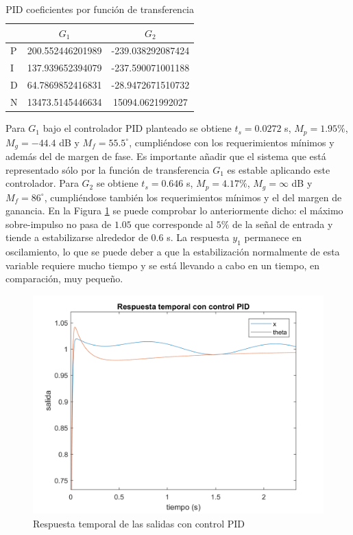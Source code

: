 \documentclass[journal]{IEEEtran}
\begin{document}
\begin{table}[!h]
\centering
\caption{PID coeficientes por función de transferencia}
\label{tab:PID}
\begin{tabular}{@{}lcc@{}}
\toprule
                  & $G_1$ & $G_2$          \\ \midrule
P & 200.552446201989 & -239.038292087424 \\
I & 137.939652394079 & -237.590071001188           \\
D & 64.7869852416831 & -28.9472671510732                  \\
N & 13473.5145446634 & 15094.0621992027 \\ \bottomrule
\end{tabular}
\end{table}

Para $G_1$ bajo el controlador PID planteado se obtiene $t_s=0.0272$ s, $M_p=1.95\%$, $M_g=-44.4$ dB y $M_f=55.5^{\circ}$, cumpliéndose con los requerimientos mínimos y además del de margen de fase. Es importante añadir que el sistema que está representado sólo por la función de transferencia $G_1$ es estable aplicando este controlador. Para $G_2$ se obtiene $t_s=0.646$ s, $M_p=4.17\%$, $M_g=\infty$ dB y $M_f=86^{\circ}$, cumpliéndose también los requerimientos mínimos y el del margen de ganancia. En la Figura \ref{fig:PIDs} se puede comprobar lo anteriormente dicho: el máximo sobre-impulso no pasa de $1.05$ que corresponde al $5\%$ de la señal de entrada y tiende a estabilizarse alrededor de $0.6$ s. La respuesta $y_1$ permanece en oscilamiento, lo que se puede deber a que la estabilización normalmente de esta variable requiere mucho tiempo y se está llevando a cabo en un tiempo, en comparación, muy pequeño.\\    

\begin{figure}[!h]
\caption{Respuesta temporal de las salidas con control PID\label{fig:PIDs}}
  \centering
\includegraphics[scale=0.18]{Bode/PID.png}
\end{figure}
\end{document}
